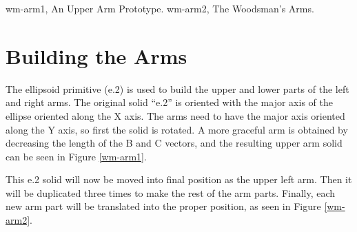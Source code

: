 
\mfig wm-arm1, An Upper Arm Prototype.
\mfig wm-arm2, The Woodsman's Arms.
\section{Building the Arms}

The ellipsoid primitive (e.2) is used to build the upper and lower parts
of the left and right arms.
The original solid ``e.2'' is oriented with the major axis of the ellipse
oriented along the X axis.
The arms need to have the major axis oriented along the Y axis,
so first the solid is rotated.
A more graceful arm is obtained by decreasing the length of
the B and C vectors, and the resulting upper arm solid can be
seen in Figure \ref{wm-arm1}.


This e.2 solid will now be moved into final position as the upper left arm.
Then it will be duplicated three times
to make the rest of the arm parts.  Finally, each new arm
part will be translated into the proper position,
as seen in Figure \ref{wm-arm2}.

